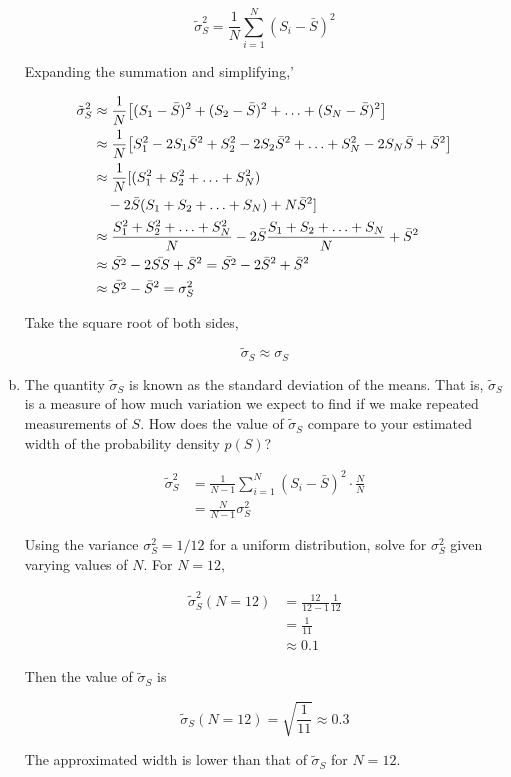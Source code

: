 \documentclass[9pt,a4paper,twocolumn]{article}
\begin{document}
\begin{enumerate}[(a)]
\begin{equation}
	\tilde{\sigma}_S^2 = \frac{1}{N}\sum_{i=1}^N (S_i - \bar{S})^2
\end{equation}

Expanding the summation and simplifying,'

\begin{align}
	\tilde{\sigma}_S^2 &\approx \frac{1}{N}\qty[(S_1 - \bar{S})^2 + (S_2 - \bar{S})^2 + \hdots + (S_N - \bar{S})^2] \nonumber \\
	&\approx \frac{1}{N}\qty[S_1^2 - 2S_1\bar{S}^2 + S_2^2 - 2S_2\bar{S}^2 + \hdots + S_N^2 - 2S_N\bar{S} + \bar{S}^2] \nonumber \\
	&\approx \frac{1}{N} [(S_1^2 + S_2^2 + \hdots + S_N^2) \nonumber \\
	&\quad - 2\bar{S}(S_1 + S_2 + \hdots + S_N) + N\bar{S}^2] \nonumber \\
	&\approx \frac{S_1^2 + S_2^2 + \hdots + S_N^2}{N} - 2\bar{S}\frac{S_1 + S_2 + \hdots + S_N}{N} + \bar{S}^2 \nonumber \\
	&\approx \bar{S^2} - 2\bar{SS} + \bar{S}^2 = \bar{S^2} - 2\bar{S}^2 + \bar{S}^2 \\
	&\approx \bar{S^2} - \bar{S}^2 = \sigma_S^2
\end{align}

Take the square root of both sides,

\begin{equation}
	\boxed{
		\tilde{\sigma}_S \approx \sigma_S
	}
\end{equation}

\item The quantity $\tilde{\sigma}_S$ is known as the standard deviation of the means. That is, $\tilde{\sigma}_S$ is a measure of how much variation we expect to find if we make repeated measurements of $S$. How does the value of $\tilde{\sigma}_S$ compare to your estimated width of the probability density $p(S)$?

\begin{align}
	\tilde{\sigma}_S^2 &= \frac{1}{N-1}\sum_{i=1}^N (S_i - \bar{S})^2 \cdot \frac{N}{N} \\
	&= \frac{N}{N - 1}\sigma_S^2
\end{align}

Using the variance $\sigma_S^2 = 1/12$ for a uniform distribution, solve for $\sigma_S^2$ given varying values of $N$. For $N=12$, 

\begin{align}
	\tilde{\sigma}_S^2(N=12) &= \frac{12}{12-1}\frac{1}{12} \\
	&= \frac{1}{11} \\
	&\approx 0.1
\end{align}

Then the value of $\tilde{\sigma}_S$ is

\begin{equation}
	\tilde{\sigma}_S(N=12) = \sqrt{\frac{1}{11}} \approx 0.3
\end{equation}

The approximated width is lower than that of $\tilde{\sigma}_S$ for $N=12$.

\end{enumerate}
\end{document}
